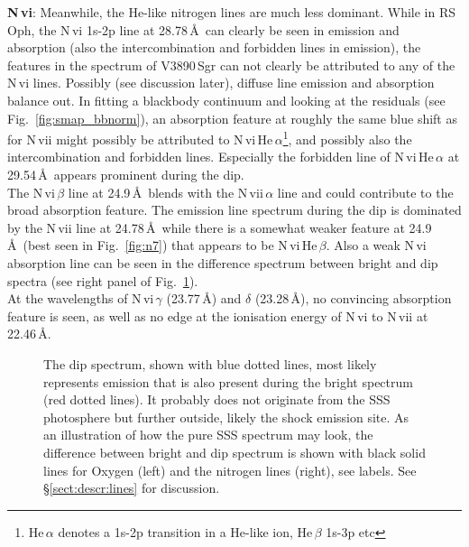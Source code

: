 \documentclass{aa}
\begin{document}
{\bf N\,{\sc vi}}: Meanwhile, the He-like nitrogen lines are much less
dominant. While in RS\,Oph, the N\,{\sc vi} 1s-2p line at 28.78\,\AA\
can clearly be seen in emission and absorption (also the intercombination
and forbidden lines in emission), the features in the spectrum of
V3890\,Sgr can not clearly be attributed to any of the N\,{\sc vi} lines.
Possibly (see discussion later), diffuse line emission and absorption
balance out. In fitting a blackbody continuum and looking
at the residuals (see Fig.~\ref{fig:smap_bbnorm}), an absorption feature
at roughly the same blue shift as for N\,{\sc vii} might possibly be
attributed to N\,{\sc vi}\,He\,$\alpha$\footnote{He\,$\alpha$ denotes
a 1s-2p transition in a He-like ion, He\,$\beta$ 1s-3p etc}, and possibly also the intercombination
and forbidden lines. Especially the forbidden line of
N\,{\sc vi}\,He\,$\alpha$ at 29.54\,\AA\ appears prominent during the dip.\\
The N\,{\sc vi}\,$\beta$ line at 24.9\,\AA\ blends with the
N\,{\sc vii}\,$\alpha$ line and could contribute to the broad absorption
feature. The emission line spectrum during the dip is dominated by
the N\,{\sc vii} line at 24.78\,\AA\ while there is a somewhat weaker
feature at 24.9\,\AA\ (best seen in Fig.~\ref{fig:n7}) that appears to
be N\,{\sc vi}\,He\,$\beta$. Also a weak N\,{\sc vi} absorption line
can be seen in the difference spectrum between bright and dip
spectra (see right panel of Fig.~\ref{fig:diff}).\\
At the wavelengths of N\,{\sc vi}\,$\gamma$ (23.77\,\AA) and
$\delta$ (23.28\,\AA), no convincing absorption feature is seen, as
well as no edge at the ionisation energy of N\,{\sc vi} to N\,{\sc vii}
at 22.46\,\AA.\\

\begin{figure}[!ht]
\resizebox{\hsize}{!}{\texttt{[image: fig7a.eps]}\texttt{[image: fig7b.eps]}}
\caption{\label{fig:diff}The dip spectrum, shown with blue dotted lines,
most likely represents emission that is also present during the
bright spectrum (red dotted lines). It probably does not originate
from the SSS photosphere but further outside, likely the shock emission
site. As an illustration of how the pure SSS spectrum may look, the difference
between bright and dip spectrum is shown with black
solid lines for Oxygen (left) and the nitrogen lines (right), see
labels. See \S\ref{sect:descr:lines} for discussion.
}
\end{figure}
\end{document}
